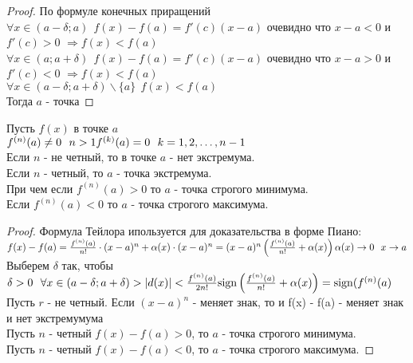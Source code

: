 \begin{proof}
  По формуле конечных приращений\\
  $\forall x \in (a - \delta; a) ~~ f(x) - f(a) = f'(c)(x - a)$ очевидно что
  $x - a < 0$ и \\ $f'(c) > 0$ $\Rightarrow f(x) < f(a)$\\
  $\forall x \in (a; a + \delta) ~~ f(x) - f(a) = f'(c)(x - a)$ очевидно что
  $x - a > 0$ и \\ $f'(c) < 0$ $\Rightarrow f(x) < f(a)$\\
  $\forall x \in (a - \delta; a+ \delta)\backslash \{a\} ~~ f(x) < f(a)$\\
  Тогда $a$ - точка 
\end{proof}

\begin{theorem}
  Пусть $f(x)$ в точке $a$\\
  $f^{(n)} (a) \neq 0 ~~ n > 1\\
  f^{(k)} (a) = 0 ~~ k = 1, 2, \ldots, n-1$\\
  Если $n$ - не четный, то в точке $a$ - нет экстремума.\\
  Если $n$ - четный, то $a$ - точка экстремума.\\
  При чем если $f^{(n)} (a) > 0$ то $a$ - точка строгого минимума.\\
  Если  $f^{(n)} (a) < 0$ то $a$ - точка строгого максимума.
\end{theorem}

\begin{proof}
  Формула Тейлора ипользуется для доказательства в форме Пиано:\\
  $f(x) - f(a) = \frac{f^{(n)}(a)}{n!} \cdot (x - a)^n + \alpha (x)
  \cdot (x - a)^n = (x - a)^n \left(\frac{f^{(n)}(a)}{n!} + \alpha(x) \right)\\
  \alpha (x) \to 0 ~~ x \to a$ \\
  Выберем $\delta$ так, чтобы $\delta > 0 ~~ \forall x \in
  (a - \delta; a + \delta) > |d(x)| < \frac{f^{(n)}(a)}{2n!}\\
  \mathrm{sign} \left(\frac{f^{(n)}(a)}{n!} + \alpha(x)\right) = \mathrm{sign} (f^{(n)}(a)$\\
  Пусть $r$ - не четный. Если $(x - a)^n$ - меняет знак, то и
  f(x) - f(a) - меняет знак и нет экстремумума\\
  Пусть $n$ - четный $f(x) - f(a) > 0$, то $a$ - точка строгого минимума.\\
  Пусть $n$ - четный $f(x) - f(a) < 0$, то $a$ - точка строгого максимума.
\end{proof}

